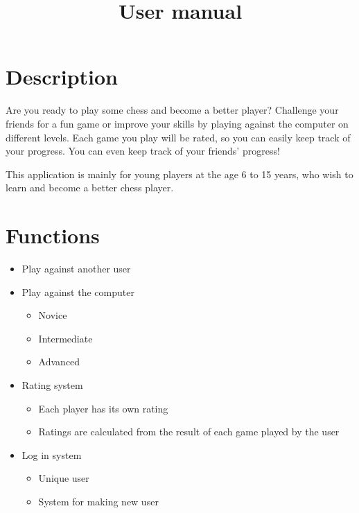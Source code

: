 \documentclass{article}
\title{User manual}
\begin{document}
\date{}
\maketitle


\section{Description}
Are you ready to play some chess and become a better player? Challenge your friends for a fun game or improve your skills by playing against the computer on different levels. Each game you play will be rated, so you can easily keep track of your progress. You can even keep track of your friends' progress! 

This application is mainly for young players at the age 6 to 15 years, who wish to learn and become a better chess player.

\section{Functions}
\begin{itemize}
\item Play against another user
\item Play against the computer
	\begin{itemize}
	\item Novice
    \item Intermediate
    \item Advanced
	\end{itemize}
\item Rating system
	\begin{itemize}
	\item Each player has its own rating
    \item Ratings are calculated from the result of each game played by the user
	\end{itemize}
\item Log in system
	\begin{itemize}
	\item Unique user
    \item System for making new user
	\end{itemize}
\end{itemize}
\end{document}
